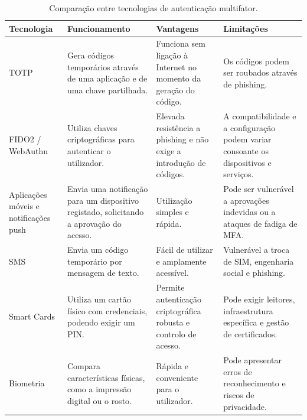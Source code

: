 \begin{table}[htbp]
\centering
\scriptsize
\setlength{\tabcolsep}{4pt}
\renewcommand{\arraystretch}{1.1}

\begin{tabularx}{\textwidth}{|>{\raggedright\arraybackslash}p{2.2cm}|X|X|X|}
\hline
\textbf{Tecnologia} & \textbf{Funcionamento} & \textbf{Vantagens} & \textbf{Limitações} \\
\hline
TOTP &
Gera códigos temporários através de uma aplicação e de uma chave partilhada. &
Funciona sem ligação à Internet no momento da geração do código. &
Os códigos podem ser roubados através de phishing. \\
\hline
FIDO2 / WebAuthn &
Utiliza chaves criptográficas para autenticar o utilizador. &
Elevada resistência a phishing e não exige a introdução de códigos. &
A compatibilidade e a configuração podem variar consoante os dispositivos e serviços. \\
\hline
Aplicações móveis e notificações push &
Envia uma notificação para um dispositivo registado, solicitando a aprovação do acesso. &
Utilização simples e rápida. &
Pode ser vulnerável a aprovações indevidas ou a ataques de fadiga de MFA. \\
\hline
SMS &
Envia um código temporário por mensagem de texto. &
Fácil de utilizar e amplamente acessível. &
Vulnerável a troca de SIM, engenharia social e phishing. \\
\hline
Smart Cards &
Utiliza um cartão físico com credenciais, podendo exigir um PIN. &
Permite autenticação criptográfica robusta e controlo de acesso. &
Pode exigir leitores, infraestrutura específica e gestão de certificados. \\
\hline
Biometria &
Compara características físicas, como a impressão digital ou o rosto. &
Rápida e conveniente para o utilizador. &
Pode apresentar erros de reconhecimento e riscos de privacidade. \\
\hline
\end{tabularx}

\caption{Comparação entre tecnologias de autenticação multifator.}
\label{tab:comparacao-tecnologias-mfa}
\end{table}